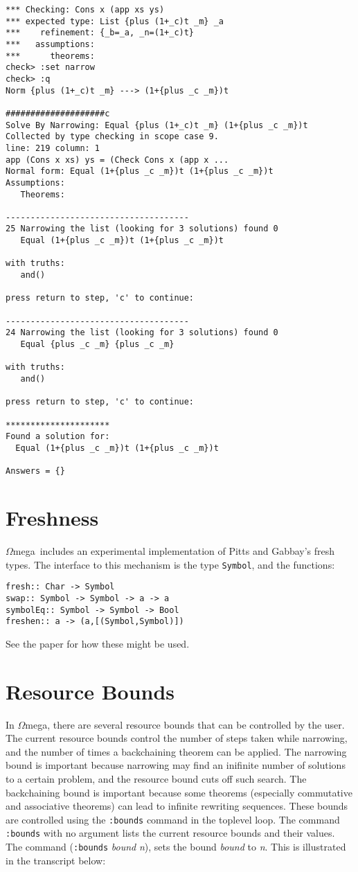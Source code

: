 \documentclass[11pt,twoside]{article}
\newcommand{\om}{$\Omega$mega}
\begin{document}
\begin{verbatim}
*** Checking: Cons x (app xs ys)
*** expected type: List {plus (1+_c)t _m} _a
***    refinement: {_b=_a, _n=(1+_c)t}
***   assumptions:
***      theorems:
check> :set narrow
check> :q
Norm {plus (1+_c)t _m} ---> (1+{plus _c _m})t

####################c
Solve By Narrowing: Equal {plus (1+_c)t _m} (1+{plus _c _m})t
Collected by type checking in scope case 9.
line: 219 column: 1
app (Cons x xs) ys = (Check Cons x (app x ...
Normal form: Equal (1+{plus _c _m})t (1+{plus _c _m})t
Assumptions:
   Theorems:

-------------------------------------
25 Narrowing the list (looking for 3 solutions) found 0
   Equal (1+{plus _c _m})t (1+{plus _c _m})t

with truths:
   and()

press return to step, 'c' to continue:

-------------------------------------
24 Narrowing the list (looking for 3 solutions) found 0
   Equal {plus _c _m} {plus _c _m}

with truths:
   and()

press return to step, 'c' to continue:

*********************
Found a solution for:
  Equal (1+{plus _c _m})t (1+{plus _c _m})t

Answers = {}
\end{verbatim}


\section{Freshness} \label{fresh}

\om\ includes an experimental implementation of Pitts and Gabbay's
fresh types\cite{gabbay-pitts-02}. The interface to this mechanism
is the type {\tt Symbol}, and the functions:
\begin{verbatim}
fresh:: Char -> Symbol
swap:: Symbol -> Symbol -> a -> a
symbolEq:: Symbol -> Symbol -> Bool
freshen:: a -> (a,[(Symbol,Symbol)])
\end{verbatim}
See the paper for how these might be used.


\section{Resource Bounds}\label{bounds}

In \om, there are several resource bounds that can be controlled by
the user. The current resource bounds control the number of
steps taken while narrowing, and the number of times a backchaining
theorem can be applied. The narrowing bound is important
because narrowing may find an inifinite number of solutions
to a certain problem, and the resource bound cuts off such search.
The backchaining bound is important because some theorems
(especially commutative and associative theorems) can
lead to infinite rewriting sequences. These bounds are controlled
using the {\tt :bounds} command in the toplevel loop. The
command {\tt :bounds} with no argument lists the current resource bounds
and their values. The command ({\tt :bounds} {\it bound} {\it n}),
sets the bound {\it bound} to {\it n}. This is illustrated
in the transcript below:
\end{document}
